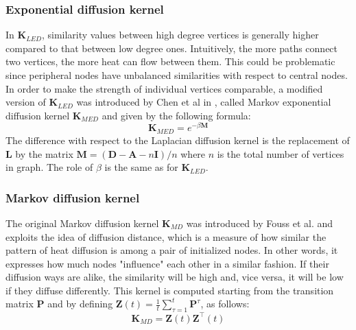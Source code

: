 \subsubsection*{Exponential diffusion kernel}
In $\textbf{K}_{LED}$, similarity values between high degree vertices is generally higher compared to that between low degree ones. Intuitively, the more paths connect two vertices, the more heat can flow between them. This could be problematic since peripheral nodes have unbalanced similarities with respect to central nodes. In order to make the strength of individual vertices comparable, a modified version of $\textbf{K}_{LED}$ was introduced by Chen et al in \cite{mrf}, called Markov exponential diffusion kernel $\textbf{K}_{MED}$ and given by the following formula:
\begin{equation} \label{MEDK-formula}
\textbf{K}_{MED} = e^{-\beta \textbf{M}}
\end{equation}
The difference with respect to the Laplacian diffusion kernel is the replacement of $\textbf{L}$ by the matrix $\textbf{M}=(\textbf{D}-\textbf{A}-n\textbf{I})/n$ where $n$ is the total number of vertices in graph. The role of $\beta$ is the same as for $\textbf{K}_{LED}$.
\subsubsection*{Markov diffusion kernel}
The original Markov diffusion kernel $\textbf{K}_{MD}$ was introduced by Fouss et al. \cite{mdk} and exploits the idea of diffusion distance, which is a measure of how similar the pattern of heat diffusion is among a pair of initialized nodes. In other words, it expresses how much nodes "influence" each other in a similar fashion. If their diffusion ways are alike, the similarity will be high and, vice versa, it will be low if they diffuse differently. This kernel is computed starting from the transition matrix $\textbf{P}$ and by defining $\textbf{Z}(t) = \frac{1}{t}\sum_{\tau=1}^{t}\textbf{P}^{\tau}$, as follows:
\begin{equation} \label{MDK-formula}
\textbf{K}_{MD} = \textbf{Z}(t)\textbf{Z}^{\top}(t)
\end{equation}
